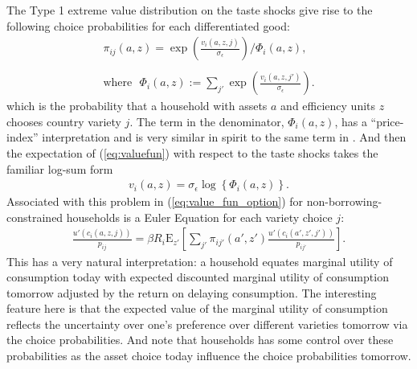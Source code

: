 \documentclass[12pt,pdftex]{article}
\begin{document}
\begin{onehalfspacing}
The Type 1 extreme value distribution on the taste shocks give rise to the following choice probabilities for each differentiated good:
\begin{align}
\pi_{ij}(a, z) = \exp \left( \frac{ v_{i}(a, z, j) }{\sigma_{\epsilon}} \right) \Bigg / \Phi_{i}(a,z), \label{eq:choice-prob} \\
\nonumber \\
\mbox{where} \ \ \ \Phi_{i}(a,z) := \sum_{j'} \exp \left( \frac{ v_{i}(a, z, j') }{\sigma_{\epsilon}} \right). \label{eq:big-phi}
\end{align}
which is the probability that a household with assets $a$ and efficiency units $z$ chooses country variety $j$. The term in the denominator, $\Phi_{i}(a,z)$, has a ``price-index'' interpretation and is very similar in spirit to the same term in \citet{eaton2002technology}. And then the expectation of (\ref{eq:valuefun}) with respect to the taste shocks takes the familiar log-sum form
\begin{align}
v_i(a, z) = \sigma_{\epsilon} \log \left\{ \Phi_{i}(a,z)  \right\}. \label{eq:log_sum}
\end{align}
Associated with this problem in (\ref{eq:value_fun_option}) for non-borrowing-constrained households is a Euler Equation for each variety choice $j$:
\begin{align}
\frac{u'(c_{i}(a, z, j))}{p_{ij}} = \beta R_{i} \mathrm{E}_{z'} \left[ \sum_{j'} \pi_{ij'}(a', z') \frac{u'(c_{i}(a', z', j'))}{p_{ij'}} \right].
\label{eq:euler_equation}
\end{align}
This has a very natural interpretation: a household equates marginal utility of consumption today with expected discounted marginal utility of consumption tomorrow adjusted by the return on delaying consumption. The interesting feature here is that the expected value of the marginal utility of consumption reflects the uncertainty over one's preference over different varieties tomorrow via the choice probabilities. And note that households has some control over these probabilities as the asset choice today influence the choice probabilities tomorrow.


\end{onehalfspacing}
\end{document}
